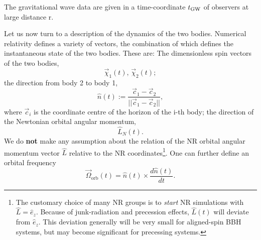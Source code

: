 \documentclass[11pt,tightenlines,article,amssymb,amsmath,amsfonts,superscriptaddress,nofootinbib]{revtex4}
\newcommand{\EzNR}{\hat e_z}
\newcommand{\nNR}{\hat{n}}
\newcommand{\lNR}{\hat L}
\newcommand{\tGW}{t_{\rm GW}}
\begin{document}
The gravitational wave data are given in a time-coordinate $\tGW$ of
observers at large distance r.

Let us now turn to a description of the dynamics of the two bodies.
Numerical relativity defines a variety of vectors, the combination of
which defines the instantaneous state of the two bodies.  These are:
The dimensionless spin vectors of the two bodies,
\begin{equation}\label{eq:chi}
  \vec\chi_1(t),\, \vec\chi_2(t);
\end{equation}
the direction from body 2 to body 1,
\begin{equation}
\label{eq:nhat}
  \nNR(t) := \frac{\vec{c}_1 - \vec{c}_2}{|| \vec{c}_1 - \vec{c}_2 ||},
\end{equation}
where $\vec{c}_i$ is the coordinate centre of the horizon of the i-th body;
the direction of the Newtonian orbital angular momentum,
\begin{equation}
  \hat L_N(t).
\end{equation}
We do {\bf not} make any assumption about the relation of the
NR orbital angular momentum vector $\lNR$ relative to the NR
coordinates\footnote{The customary choice of many NR groups is to
  \emph{start} NR simulations with $\lNR=\EzNR$.  Because of
  junk-radiation and precession effects, $\lNR(t)$ will deviate from
  $\EzNR$.  This deviation generally will be very small for
  aligned-spin BBH systems, but may become significant for precessing
  systems.}.
One can further define an orbital frequency
\begin{equation}\label{eq:Omega}
  \vec\Omega_\mathrm{orb}(t) = \nNR(t) \times \frac{d\nNR(t)}{dt}.
\end{equation}
\end{document}
